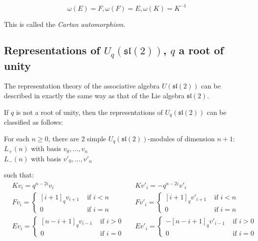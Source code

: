 \documentclass[]{article}
\begin{document}
\begin{equation}
    \omega(E) = F, \omega(F) = E, \omega(K) = K^{-1}
\end{equation}

This is called the \emph{Cartan automorphism}.

\subsection{Representations of $U_q(\mathfrak{sl}(2))$, $q$ a root of unity}

The representation theory of the associative algebra $U(\mathfrak{sl}(2))$ can
be described in exactly the same way as that of the Lie algebra
$\mathfrak{sl(2)}$. 

If $q$ is not a root of unity, then the representations of $U_q(\mathfrak{sl}(2))$ can be classified as follows: 

For each $n\geq 0$, there are 2 simple $U_q(\mathfrak{sl}(2))$-modules of dimension $n+1$: 
$L_+(n)$ with basis $v_0, \ldots, v_n$ \\
$L_-(n)$ with basis $v'_0, \ldots, v'_n$

such that: 
\begin{align*}
    &K v_i = q^{n-2i} v_i  &
    &K v'_i = -q^{n-2i} v'_i \\
    &F v_i = \begin{cases} [i+1]_qv_{i+1}& \text{ if $i < n$} \\ 0& \text{ if $i = n$} \end{cases} &
    &F v'_i = \begin{cases} [i+1]_qv'_{i+1}& \text{ if $i < n$} \\ 0& \text{ if $i = n$} \end{cases} \\
    &E v_i = \begin{cases} 
                     [n-i+1]_qv_{i-1}& \text{ if $i > 0$} \\ 
                    0& \text{ if $i = 0$} 
             \end{cases} &
    &E v'_i = \begin{cases} 
                    -[n-i+1]_q v'_{i-1}& \text{ if $i > 0$} \\ 
                    0& \text{ if $i = 0$} 
             \end{cases}
\end{align*}
\end{document}
